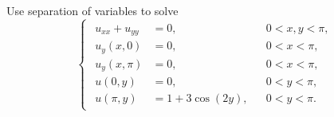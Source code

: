\documentclass[plain]{pset}
\begin{document}
\begin{problem}
Use separation of variables to solve
\[
    \begin{cases}
        \begin{aligned}
            u_{xx} + u_{yy} & = 0,             &  & 0 < x, y < \pi, \\
            u_y(x, 0)       & = 0,             &  & 0 < x < \pi,    \\
            u_y(x, \pi)     & = 0,             &  & 0 < x < \pi,    \\
            u(0, y)         & = 0,             &  & 0 < y < \pi,    \\
            u(\pi, y)       & = 1 + 3\cos(2y), &  & 0 < y < \pi.
        \end{aligned}
    \end{cases}
\]
\end{problem}
\end{document}
